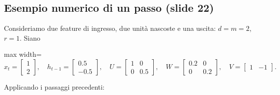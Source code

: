 \documentclass[11pt,a4paper,oneside,openany]{book}
\begin{document}
\subsection{Esempio numerico di un passo (slide 22)}\label{f03-r291}

Consideriamo due feature di ingresso, due unità nascoste e una uscita: \(d=m=2\), \(r=1\). Siano

\begin{center}
\begin{adjustbox}{max width=\linewidth}
$\displaystyle 
x_t=\begin{bmatrix}1\\2\end{bmatrix},\quad
h_{t-1}=\begin{bmatrix}0.5\\-0.5\end{bmatrix},\quad
U=\begin{bmatrix}1&0\\0&0.5\end{bmatrix},\quad
W=\begin{bmatrix}0.2&0\\0&0.2\end{bmatrix},\quad
V=\begin{bmatrix}1&-1\end{bmatrix}.
$
\end{adjustbox}
\end{center}

Applicando i passaggi precedenti:
\end{document}
